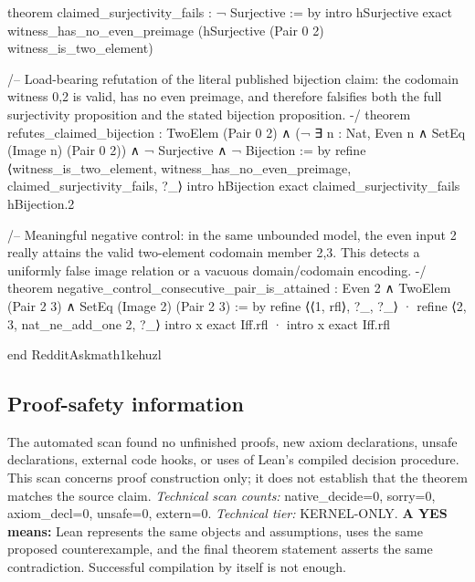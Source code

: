 \documentclass[11pt]{article}
\begin{document}
\begin{Vlean}
theorem claimed_surjectivity_fails : ¬ Surjective := by
  intro hSurjective
  exact witness_has_no_even_preimage
    (hSurjective (Pair 0 2) witness_is_two_element)

/-- Load-bearing refutation of the literal published bijection claim: the
codomain witness {0,2} is valid, has no even preimage, and therefore falsifies
both the full surjectivity proposition and the stated bijection proposition. -/
theorem refutes_claimed_bijection :
    TwoElem (Pair 0 2) ∧
    (¬ ∃ n : Nat, Even n ∧ SetEq (Image n) (Pair 0 2)) ∧
    ¬ Surjective ∧
    ¬ Bijection := by
  refine ⟨witness_is_two_element, witness_has_no_even_preimage,
    claimed_surjectivity_fails, ?_⟩
  intro hBijection
  exact claimed_surjectivity_fails hBijection.2

/-- Meaningful negative control: in the same unbounded model, the even input
2 really attains the valid two-element codomain member {2,3}.  This detects a
uniformly false image relation or a vacuous domain/codomain encoding. -/
theorem negative_control_consecutive_pair_is_attained :
    Even 2 ∧
    TwoElem (Pair 2 3) ∧
    SetEq (Image 2) (Pair 2 3) := by
  refine ⟨⟨1, rfl⟩, ?_, ?_⟩
  · refine ⟨2, 3, nat_ne_add_one 2, ?_⟩
    intro x
    exact Iff.rfl
  · intro x
    exact Iff.rfl

end RedditAskmath1kehuzl

\end{Vlean}
\subsection*{Proof-safety information}
The automated scan found no unfinished proofs, new axiom declarations, unsafe declarations, external code hooks, or uses of Lean's compiled decision procedure. This scan concerns proof construction only; it does not establish that the theorem matches the source claim.
\textit{Technical scan counts:} native\_decide=0, sorry=0, axiom\_decl=0, unsafe=0, extern=0. \textit{Technical tier:} KERNEL-ONLY.
\textbf{A YES means:} Lean represents the same objects and assumptions, uses the same proposed counterexample, and the final theorem statement asserts the same contradiction. Successful compilation by itself is not enough.
\clearpage
\end{document}
